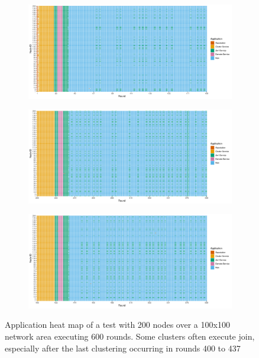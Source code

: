 \begin{figure}[H]
    \centering
    \begin{subfigure}{0.9\textwidth}
        \centering
        \includegraphics[width=\textwidth]{figure/Results/ReliabilityDiscussionApplicationHeatmaps/applicationmap200x200_1.pdf}
        \label{subfig:application-map-200-nodes-round-1-199}
    \end{subfigure}
    \hfill
    \begin{subfigure}{0.9\textwidth}
        \centering
        \includegraphics[width=\textwidth]{figure/Results/ReliabilityDiscussionApplicationHeatmaps/applicationmap200x200_2.pdf}
        \label{subfig:application-map-200-nodes-round-200-399}
    \end{subfigure}
    \begin{subfigure}{0.9\textwidth}
        \centering
        \includegraphics[width=\textwidth]{figure/Results/ReliabilityDiscussionApplicationHeatmaps/applicationmap200x200_3.pdf}
        \label{subfig:application-map-200-nodes-round-400-599}
    \end{subfigure}
    \caption{Application heat map of a test with 200 nodes over a 100x100 network area executing 600 rounds. Some clusters often execute join, especially after the last clustering occurring in rounds 400 to 437}
    \label{fig:application-map-200-nodes}
\end{figure}